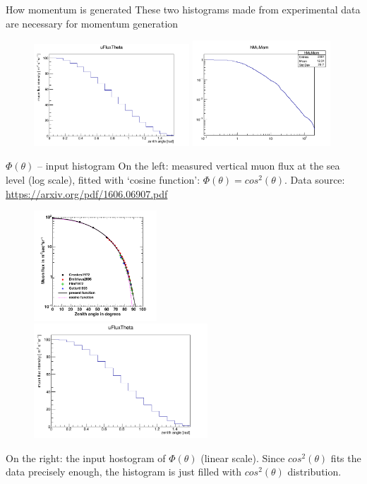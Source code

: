\documentclass{beamer}
\begin{document}
\begin{frame}{How momentum is generated}
These two histograms made from experimental data are necessary for momentum generation
\begin{figure}
\includegraphics[width=0.52\textwidth]{images/uFluxTheta.png}%
\includegraphics[width=0.46\textwidth]{images/hmomfull.png}
\end{figure}
\end{frame}

\begin{frame}{$\Phi(\theta)$ -- input histogram}
On the left: measured vertical muon flux at the sea level (log scale), fitted with `cosine function': $\Phi(\theta) = cos^2(\theta)$. Data source: \textcolor{blue}{\href{https://arxiv.org/pdf/1606.06907.pdf}{https://arxiv.org/pdf/1606.06907.pdf}}
\begin{figure}
\includegraphics[width=0.41\textwidth]{images/cosine_experiment.png}%
\includegraphics[width=0.58\textwidth]{images/uFluxTheta.png}
\end{figure}
On the right: the input hostogram of $\Phi(\theta)$ (linear scale). Since $cos^2(\theta)$ fits the data precisely enough, the histogram is just filled with $cos^2(\theta)$ distribution.
\end{frame}
\end{document}
